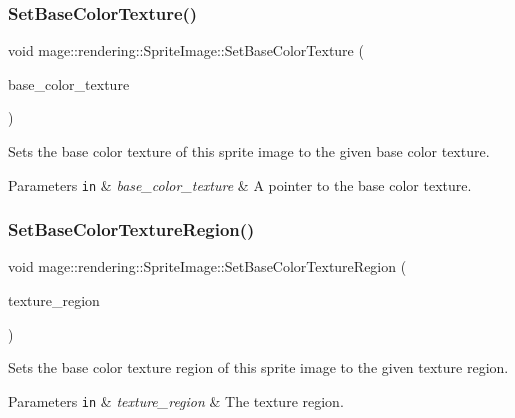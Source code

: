 \subsubsection{\texorpdfstring{Set\+Base\+Color\+Texture()}{SetBaseColorTexture()}}
{\footnotesize\ttfamily void mage\+::rendering\+::\+Sprite\+Image\+::\+Set\+Base\+Color\+Texture (\begin{DoxyParamCaption}\item[{\hyperlink{namespacemage_1_1rendering_a6f3ae54f825328465b0cdde0f0de4a36}{Texture\+Ptr}}]{base\+\_\+color\+\_\+texture }\end{DoxyParamCaption})\hspace{0.3cm}{\ttfamily [noexcept]}}

Sets the base color texture of this sprite image to the given base color texture.


\begin{DoxyParams}[1]{Parameters}
\mbox{\tt in}  & {\em base\+\_\+color\+\_\+texture} & A pointer to the base color texture. \\
\hline
\end{DoxyParams}
\hypertarget{classmage_1_1rendering_1_1_sprite_image_a54b349a9f73c7d6f3ded4a3d1f3172bf}{}\label{classmage_1_1rendering_1_1_sprite_image_a54b349a9f73c7d6f3ded4a3d1f3172bf} 
\subsubsection{\texorpdfstring{Set\+Base\+Color\+Texture\+Region()}{SetBaseColorTextureRegion()}}
{\footnotesize\ttfamily void mage\+::rendering\+::\+Sprite\+Image\+::\+Set\+Base\+Color\+Texture\+Region (\begin{DoxyParamCaption}\item[{R\+E\+CT}]{texture\+\_\+region }\end{DoxyParamCaption})\hspace{0.3cm}{\ttfamily [noexcept]}}

Sets the base color texture region of this sprite image to the given texture region.


\begin{DoxyParams}[1]{Parameters}
\mbox{\tt in}  & {\em texture\+\_\+region} & The texture region. \\
\hline
\end{DoxyParams}
\hypertarget{classmage_1_1rendering_1_1_sprite_image_a5b0a8abc53768cce82c3c2f8f1a96745}{}\label{classmage_1_1rendering_1_1_sprite_image_a5b0a8abc53768cce82c3c2f8f1a96745} 
